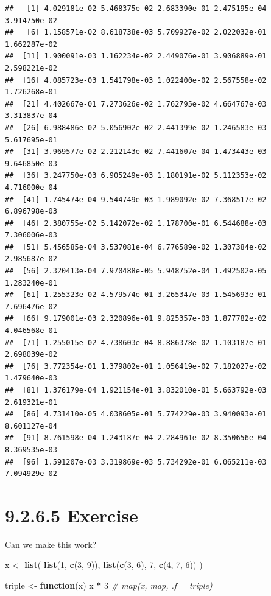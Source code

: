 \documentclass[]{book}
\newenvironment{Shaded}{\begin{snugshade}}{\end{snugshade}}
\newcommand{\CommentTok}[1]{\textcolor[rgb]{0.56,0.35,0.01}{\textit{#1}}}
\newcommand{\ControlFlowTok}[1]{\textcolor[rgb]{0.13,0.29,0.53}{\textbf{#1}}}
\newcommand{\DecValTok}[1]{\textcolor[rgb]{0.00,0.00,0.81}{#1}}
\newcommand{\KeywordTok}[1]{\textcolor[rgb]{0.13,0.29,0.53}{\textbf{#1}}}
\newcommand{\NormalTok}[1]{#1}
\newcommand{\OperatorTok}[1]{\textcolor[rgb]{0.81,0.36,0.00}{\textbf{#1}}}
\newcommand{\StringTok}[1]{\textcolor[rgb]{0.31,0.60,0.02}{#1}}
\begin{document}
\begin{verbatim}
##   [1] 4.029181e-02 5.468375e-02 2.683390e-01 2.475195e-04 3.914750e-02
##   [6] 1.158571e-02 8.618738e-03 5.709927e-02 2.022032e-01 1.662287e-02
##  [11] 1.900091e-03 1.162234e-02 2.449076e-01 3.906889e-01 2.598221e-02
##  [16] 4.085723e-03 1.541798e-03 1.022400e-02 2.567558e-02 1.726268e-01
##  [21] 4.402667e-01 7.273626e-02 1.762795e-02 4.664767e-03 3.313837e-04
##  [26] 6.988486e-02 5.056902e-02 2.441399e-02 1.246583e-03 5.617695e-01
##  [31] 3.969577e-02 2.212143e-02 7.441607e-04 1.473443e-03 9.646850e-03
##  [36] 3.247750e-03 6.905249e-03 1.180191e-02 5.112353e-02 4.716000e-04
##  [41] 1.745474e-04 9.544749e-03 1.989092e-02 7.368517e-02 6.896798e-03
##  [46] 2.380755e-02 5.142072e-02 1.178700e-01 6.544688e-03 7.306006e-03
##  [51] 5.456585e-04 3.537081e-04 6.776589e-02 1.307384e-02 2.985687e-02
##  [56] 2.320413e-04 7.970488e-05 5.948752e-04 1.492502e-05 1.283240e-01
##  [61] 1.255323e-02 4.579574e-01 3.265347e-03 1.545693e-01 7.696476e-02
##  [66] 9.179001e-03 2.320896e-01 9.825357e-03 1.877782e-02 4.046568e-01
##  [71] 1.255015e-02 4.738603e-04 8.886378e-02 1.103187e-01 2.698039e-02
##  [76] 3.772354e-01 1.379802e-01 1.056419e-02 7.182027e-02 1.479640e-03
##  [81] 1.376179e-04 1.921154e-01 3.832010e-01 5.663792e-03 2.619321e-01
##  [86] 4.731410e-05 4.038605e-01 5.774229e-03 3.940093e-01 8.601127e-04
##  [91] 8.761598e-04 1.243187e-04 2.284961e-02 8.350656e-04 8.369535e-03
##  [96] 1.591207e-03 3.319869e-03 5.734292e-01 6.065211e-03 7.094929e-02
\end{verbatim}

\hypertarget{exercise-9}{%
\section*{9.2.6.5 Exercise}\label{exercise-9}}

Can we make this work?

\begin{Shaded}
\begin{Highlighting}[]
\NormalTok{x <-}\StringTok{ }\KeywordTok{list}\NormalTok{(}
  \KeywordTok{list}\NormalTok{(}\DecValTok{1}\NormalTok{, }\KeywordTok{c}\NormalTok{(}\DecValTok{3}\NormalTok{, }\DecValTok{9}\NormalTok{)),}
  \KeywordTok{list}\NormalTok{(}\KeywordTok{c}\NormalTok{(}\DecValTok{3}\NormalTok{, }\DecValTok{6}\NormalTok{), }\DecValTok{7}\NormalTok{, }\KeywordTok{c}\NormalTok{(}\DecValTok{4}\NormalTok{, }\DecValTok{7}\NormalTok{, }\DecValTok{6}\NormalTok{))}
\NormalTok{)}

\NormalTok{triple <-}\StringTok{ }\ControlFlowTok{function}\NormalTok{(x) x }\OperatorTok{*}\StringTok{ }\DecValTok{3}
\CommentTok{# map(x, map, .f = triple)}
\end{Highlighting}
\end{Shaded}
\end{document}
